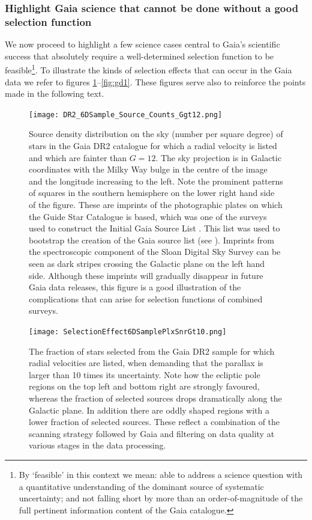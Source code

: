 \subsubsection{Highlight Gaia science that cannot be done without a good selection function}
\label{sec:notpossible}

We now proceed to highlight a few science cases central to Gaia's scientific success that absolutely require a well-determined selection function to be feasible\footnote{By `feasible' in this context we mean: able to address a science question with a quantitative understanding of the dominant source of systematic uncertainty; and not falling short by more than an order-of-magnitude of the full pertinent information content of the Gaia catalogue.}. To illustrate the kinds of selection effects that can occur in the Gaia data we refer to figures \ref{fig:6dsample}--\ref{fig:gd1}. These figures serve also to reinforce the points made in the following text.
\\

\begin{figure}
    \centering
    \texttt{[image: DR2\_6DSample\_Source\_Counts\_Ggt12.png]}
    \caption{Source density distribution on the sky (number per square degree) of stars in the Gaia DR2 catalogue for which a radial velocity is listed and which are fainter than $G=12$. The sky projection is in Galactic coordinates with the Milky Way bulge in the centre of the image and the longitude increasing to the left. Note the prominent patterns of squares in the southern hemisphere on the lower right hand side of the figure. These are imprints of the photographic plates on which the Guide Star Catalogue is based, which was one of the surveys used to construct the Initial Gaia Source List \cite{2014A&A...570A..87S}. This list was used to bootstrap the creation of the Gaia source list (see ). Imprints from the spectroscopic component of the Sloan Digital Sky Survey can be seen as dark stripes crossing the Galactic plane on the left hand side. Although these imprints will gradually disappear in future Gaia data releases, this figure is a good illustration of the complications that can arise for selection functions of combined surveys.}
    \label{fig:6dsample}
\end{figure}

\begin{figure}
    \centering
    \texttt{[image: SelectionEffect6DSamplePlxSnrGt10.png]}
    \caption{The fraction of stars selected from the Gaia DR2 sample for which radial velocities are listed, when demanding that the parallax is larger than 10 times its uncertainty. Note how the ecliptic pole regions on the top left and bottom right are strongly favoured, whereas the fraction of selected sources drops dramatically along the Galactic plane. In addition there are oddly shaped regions with a lower fraction of selected sources. These reflect a combination of the scanning strategy followed by Gaia and filtering on data quality at various stages in the data processing.}
    \label{fig:6dplxsnrgt10}
\end{figure}

